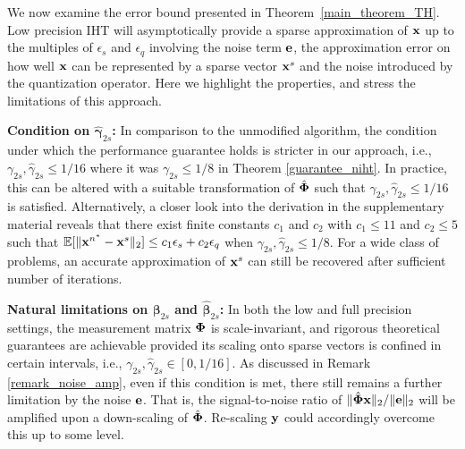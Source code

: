 \documentclass[aoas,preprint]{imsart}
\numberwithin{equation}{section}
\theoremstyle{plain}
\begin{document}
We now examine the error bound presented in Theorem~\ref{main_theorem_TH}. Low precision IHT will asymptotically provide a sparse approximation of ${\bf x}$ up to the multiples of $ {\epsilon}_s$ and $ {\epsilon}_q$ involving the noise term ${\bf e}$, the approximation error on how well ${\bf x}$ can be represented by a sparse vector ${\bf x}^s$ and the noise introduced by the quantization operator. 
Here we highlight the properties, and stress the limitations of this approach.
\vspace{0.5em}

{\bf Condition on $\hat{\boldsymbol{\gamma}}_{2s}$:} In comparison to the unmodified algorithm, the condition under which the performance guarantee holds is stricter in our approach, i.e., ${\gamma}_{2s}, \hat{\gamma}_{2s}\leq 1/16$ where it was ${\gamma}_{2s}\leq 1/8$ in Theorem \ref{guarantee_niht}. In practice, this can be altered with a suitable transformation of $\hat{\bf \Phi}$ such that ${\gamma}_{2s}, \hat{\gamma}_{2s}\leq 1/16$ is satisfied. Alternatively, a closer look into the derivation in the supplementary material reveals that there exist finite constants $c_1$ and $c_2$ with $c_1\leq 11$ and $c_2\leq 5$ such that $\mathbb{E}[\|{\bf x}^{n^*}-{\bf x}^s \|_2] \leq c_1\epsilon_s + c_2\epsilon_q$ when ${\gamma}_{2s}, \hat{\gamma}_{2s}\leq 1/8$. For a wide class of problems, an accurate approximation of ${\bf x}^s$ can still be recovered after sufficient number of iterations.
\vspace{0.5em}

{\bf Natural limitations on ${\boldsymbol{\beta}}_{2s}$ and $\hat{\boldsymbol{\beta}}_{2s}$:} In both the low and full precision settings, the measurement matrix ${\bf \Phi}$ is scale-invariant, and rigorous theoretical guarantees are achievable provided its scaling onto sparse vectors is confined in certain intervals, i.e., ${\gamma}_{2s}, \hat{\gamma}_{2s}\in [0, 1/16]$. As discussed in Remark \ref{remark_noise_amp}, even if this condition is met, there still remains a further limitation by the noise ${\bf e}$. That is, the signal-to-noise ratio of $\|\hat{\bf \Phi} {\bf x} \|_2/\|{\bf e} \|_2$ will be amplified upon a down-scaling of $\hat{\bf \Phi}$. Re-scaling ${\bf y}$ could accordingly overcome this up to some level. 
\end{document}
